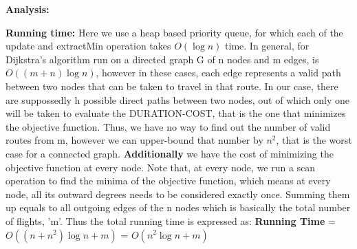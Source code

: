 \documentclass{article}
\newcommand\runtime{\vspace{.10in}\textbf{Running time: }}
\begin{document}
 \textbf {Analysis:}

 \runtime Here we use a heap based priority queue, for which each of the update and extractMin operation takes $O(\log n)$ time. In general, for  Dijkstra's algorithm run on a directed graph G of n nodes and m edges, is $O((m+n)\log n)$, however in these cases, each edge represents a valid path between two nodes that can be taken to travel in that route. In our case, there are suppossedly h possible direct paths between two nodes, out of which only one will be taken to evaluate the DURATION-COST, that is the one that minimizes the objective function. Thus, we have no way to find out the number of valid routes from m, however we can upper-bound that number by $n^2$, that is the worst case for a connected graph. \textbf {Additionally} we have the cost of minimizing the objective function at every node. Note that, at every node, we run a scan operation to find the minima of the objective function, which means at every node, all its outward degrees needs to be considered exactly once. Summing them up equals to all outgoing edges of the n nodes which is basically the total number of flights, 'm'. Thus the total running time is expressed as: \newline
\textbf {Running Time} = $O((n + n^2)\log n + m)$ = $O(n^2\log n + m)$ \newline
\end{document}
